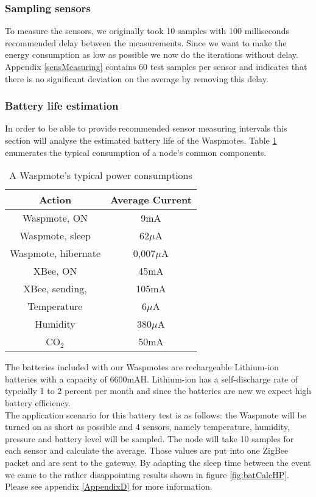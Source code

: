 \subsubsection{Sampling sensors}
\label{duty}
To measure the sensors, we originally took 10 samples with 100 milliseconds recommended delay between the measurements. Since we want to make the energy consumption as low as possible we now do the iterations without delay. Appendix \ref{sensMeasuring} contains 60 test samples per sensor and indicates that there is no significant deviation on the average by removing this delay.\\ 
\subsubsection{Battery life estimation}
\label{batLife1}
In order to be able to provide recommended sensor measuring intervals this section will analyse the estimated battery life of the Waspmotes. Table \ref{tab:conss} enumerates the typical consumption of a node's common components.
\begin{table}[!ht]
\begin{center}
\begin{tabular}[!ht]{|c|c|}
\hline
\textbf{Action} & \textbf{Average Current}\\
\hline
Waspmote, ON & 9mA\\
\hline
Waspmote, sleep & 62$\mu$A\\
\hline
Waspmote, hibernate & 0,007$\mu$A\\
\hline
XBee, ON & 45mA\\
\hline
XBee, sending, & 105mA\\
\hline
Temperature & 6$\mu$A\\
\hline
Humidity & 380$\mu$A\\
\hline
CO$_{2}$ & 50mA\\
\hline
\end{tabular}
\caption{A Waspmote's typical power consumptions}
\label{tab:conss}
\end{center}
\end{table}
The batteries included with our Waspmotes are rechargeable Lithium-ion batteries with a capacity of 6600mAH. Lithium-ion has a self-discharge rate of typcially 1 to 2 percent per month \citep{LION} and since the batteries are new we expect high battery efficiency.\\
The application scenario for this battery test is as follows: the Waspmote will be turned on as short as possible and 4 sensors, namely temperature, humidity, pressure and battery level will be sampled. The node will take 10 samples for each sensor and calculate the average. Those values are put into one ZigBee packet and are sent to the gateway. By adapting the sleep time between the event we came to the rather disappointing results shown in figure \ref{fig:batCalcHP}. Please see appendix \ref{AppendixD} for more information.\\ 
